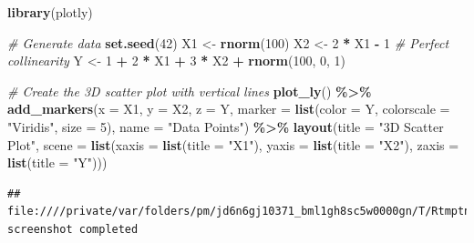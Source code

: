 \documentclass[
]{book}
\newenvironment{Shaded}{\begin{snugshade}}{\end{snugshade}}
\newcommand{\AttributeTok}[1]{\textcolor[rgb]{0.13,0.29,0.53}{#1}}
\newcommand{\CommentTok}[1]{\textcolor[rgb]{0.56,0.35,0.01}{\textit{#1}}}
\newcommand{\DecValTok}[1]{\textcolor[rgb]{0.00,0.00,0.81}{#1}}
\newcommand{\FunctionTok}[1]{\textcolor[rgb]{0.13,0.29,0.53}{\textbf{#1}}}
\newcommand{\NormalTok}[1]{#1}
\newcommand{\OtherTok}[1]{\textcolor[rgb]{0.56,0.35,0.01}{#1}}
\newcommand{\SpecialCharTok}[1]{\textcolor[rgb]{0.81,0.36,0.00}{\textbf{#1}}}
\newcommand{\StringTok}[1]{\textcolor[rgb]{0.31,0.60,0.02}{#1}}
\begin{document}
\begin{Shaded}
\begin{Highlighting}[]
\FunctionTok{library}\NormalTok{(plotly)}

\CommentTok{\# Generate data}
\FunctionTok{set.seed}\NormalTok{(}\DecValTok{42}\NormalTok{)}
\NormalTok{X1 }\OtherTok{\textless{}{-}} \FunctionTok{rnorm}\NormalTok{(}\DecValTok{100}\NormalTok{)}
\NormalTok{X2 }\OtherTok{\textless{}{-}} \DecValTok{2} \SpecialCharTok{*}\NormalTok{ X1 }\SpecialCharTok{{-}} \DecValTok{1}  \CommentTok{\# Perfect collinearity}
\NormalTok{Y  }\OtherTok{\textless{}{-}} \DecValTok{1} \SpecialCharTok{+} \DecValTok{2} \SpecialCharTok{*}\NormalTok{ X1 }\SpecialCharTok{+} \DecValTok{3} \SpecialCharTok{*}\NormalTok{ X2 }\SpecialCharTok{+} \FunctionTok{rnorm}\NormalTok{(}\DecValTok{100}\NormalTok{, }\DecValTok{0}\NormalTok{, }\DecValTok{1}\NormalTok{)}

\CommentTok{\# Create the 3D scatter plot with vertical lines}
\FunctionTok{plot\_ly}\NormalTok{() }\SpecialCharTok{\%\textgreater{}\%}
  \FunctionTok{add\_markers}\NormalTok{(}\AttributeTok{x =}\NormalTok{ X1, }\AttributeTok{y =}\NormalTok{ X2, }\AttributeTok{z =}\NormalTok{ Y, }
              \AttributeTok{marker =} \FunctionTok{list}\NormalTok{(}\AttributeTok{color =}\NormalTok{ Y, }\AttributeTok{colorscale =} \StringTok{"Viridis"}\NormalTok{, }\AttributeTok{size =} \DecValTok{5}\NormalTok{),}
              \AttributeTok{name =} \StringTok{"Data Points"}\NormalTok{) }\SpecialCharTok{\%\textgreater{}\%}
  \FunctionTok{layout}\NormalTok{(}\AttributeTok{title =} \StringTok{"3D Scatter Plot"}\NormalTok{,}
         \AttributeTok{scene =} \FunctionTok{list}\NormalTok{(}\AttributeTok{xaxis =} \FunctionTok{list}\NormalTok{(}\AttributeTok{title =} \StringTok{"X1"}\NormalTok{),}
                      \AttributeTok{yaxis =} \FunctionTok{list}\NormalTok{(}\AttributeTok{title =} \StringTok{"X2"}\NormalTok{),}
                      \AttributeTok{zaxis =} \FunctionTok{list}\NormalTok{(}\AttributeTok{title =} \StringTok{"Y"}\NormalTok{)))}
\end{Highlighting}
\end{Shaded}

\begin{verbatim}
## file:////private/var/folders/pm/jd6n6gj10371_bml1gh8sc5w0000gn/T/RtmptnNLgh/file83a72ccee379/widget83a742b833ea.html screenshot completed
\end{verbatim}
\end{document}
